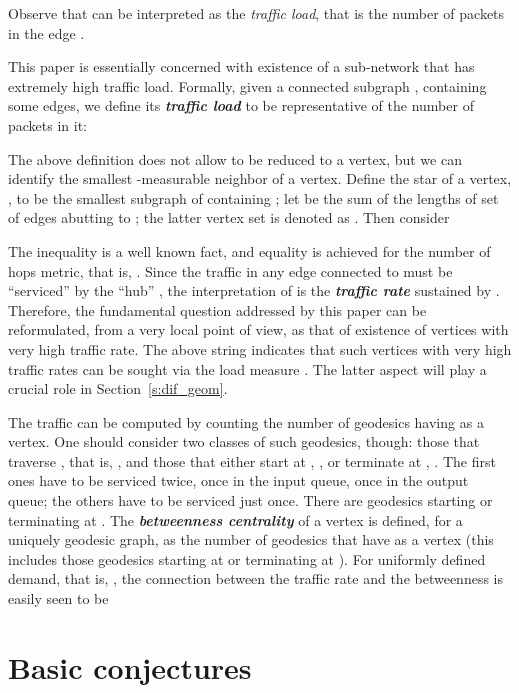 \documentclass{article}
\begin{document}
\noindent Observe that  can be interpreted as the {\it traffic load}, that is the number of packets in the edge . 

This paper is essentially concerned with existence of a sub-network that has extremely high traffic load. Formally, given a connected subgraph , containing some edges, we define its \textit{\textbf{traffic load}} to be representative of the number of packets in it:
 

The above definition does not allow  to be reduced to a vertex, but we can identify the smallest -measurable neighbor of a vertex. 
Define the star of a vertex, , to be the smallest subgraph of  containing ;  
let  be the sum of the lengths of 
set of edges abutting to ; the latter vertex set is denoted as . Then consider

\noindent 

 
The inequality is a well known fact, and equality is achieved for the number of hops metric, that is, . Since the traffic in any edge connected to  must be ``serviced'' by the ``hub'' , the interpretation of  is the \textit{\textbf{traffic rate}} sustained by . Therefore, the fundamental question addressed by this paper can be reformulated, from a very local point of view, as that of existence of vertices with very high traffic rate. The above string indicates that such vertices with very high traffic rates can be sought via the load measure . 
The latter aspect will play a crucial role in Section~\ref{s:dif_geom}. 
 

The traffic  can be computed by counting the number of geodesics  having  as a vertex. One should consider two classes of such geodesics, though: those that traverse , that is, , and those that either start at , , or terminate at , . The first ones have to be serviced twice, once in the input queue, once in the output queue; the others have to be serviced just once. There are  geodesics starting or terminating at . The \textit{\textbf{betweenness centrality}}  of a vertex  is defined, for a uniquely geodesic graph, as the number of geodesics that have  as a vertex (this includes those geodesics starting at  or terminating at ). For uniformly defined demand, that is, , the connection between the traffic rate and the betweenness is easily seen to be

\noindent 

 


\noindent 
\section{Basic conjectures}
\label{s:basic_conjectures}
\end{document}
